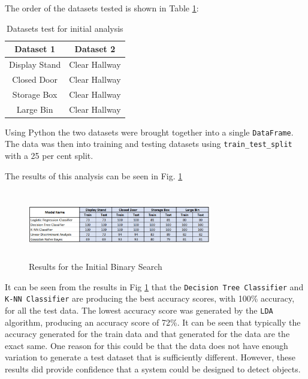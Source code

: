 \documentclass[conference]{IEEEtran}
\begin{document}
The order of the datasets tested is shown in Table \ref{table:2}:
\begin{table}[ht]
\centering
\begin{tabular}{||c c||} 
 \hline
 Dataset 1 & Dataset 2  \\ [0.5ex] 
 \hline\hline
 Display Stand & Clear Hallway  \\ 
 \hline
 Closed Door & Clear Hallway \\
 \hline
 Storage Box & Clear Hallway \\
 \hline
 Large Bin & Clear Hallway \\ [1ex] 
 \hline
\end{tabular}
\caption{Datasets test for initial analysis}
\label{table:2}
\end{table}

Using Python the two datasets were brought together into a single \texttt{DataFrame}. The data was then into training and testing datasets using \texttt{train\_test\_split} with a 25 per cent split.

The results of this analysis can be seen in Fig. \ref{fig:init_binary}
\begin{figure}[h]
\includegraphics[width=8cm, height=3cm]{images/initial_binary_search.png}
\centering
\caption{Results for the Initial Binary Search}
\label{fig:init_binary}
\end{figure}

It can be seen from the results in Fig \ref{fig:init_binary} that the \texttt{Decision Tree Classifier} and \texttt{K-NN Classifier} are producing the best accuracy scores, with 100\% accuracy, for all the test data. The lowest accuracy score was generated by the \texttt{LDA} algorithm, producing an accuracy score of 72\%. It can be seen that typically the accuracy generated for the train data and that generated for the data are the exact same. One reason for this could be that the data does not have enough variation to generate a test dataset that is sufficiently different. However, these results did provide confidence that a system could be designed to detect objects. 
\end{document}
